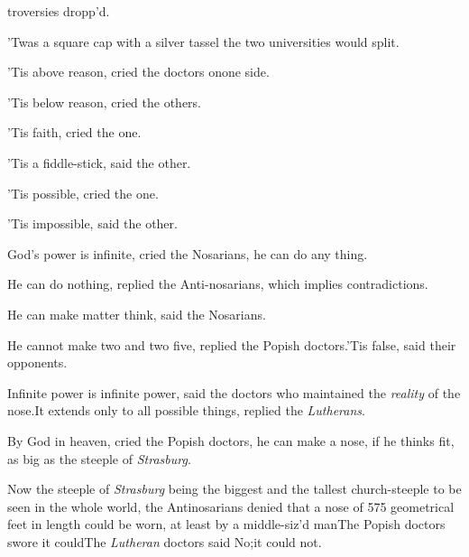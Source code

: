 \documentclass{article}
\begin{document}
\vskip -2pt

troversies dropp’d.

\vskip -2pt

’Twas a square cap with a silver tassel\break
{}
the two universities would split.

\vskip -2pt

’Tis above reason, cried the doctors on\break one side.

\vskip -2pt

’Tis below reason, cried the others.

\vskip -2pt

’Tis faith, cried the one.

’Tis a fiddle-stick, said the other.

’Tis possible, cried the one.

’Tis impossible, said the other.

God’s power is infinite, cried the No\-sarians, he can do
any thing.

He can do nothing, replied the Anti-nosarians, which implies
contradictions.

He can make matter think, said the Nosarians.


\break
{}

He cannot make two and two five, replied the Popish
doctors.\tsh ’Tis false, said their opponents.\tsk

Infinite power is infinite power, said the doctors who
maintained the \textit{reality}
of the nose.\tsh It extends only to
all possible things, replied the \textit{Lutherans}.

By God in heaven, cried the Popish doctors, he can make a nose,
if he thinks fit, as big as the steeple of \textit{Strasburg}.

Now the steeple of \textit{Strasburg} being the biggest and the
tallest church-steeple to be seen in the whole world, the
Antino\-sarians denied that a nose of 575 geome\-trical feet in length
could be worn, at least by a middle-siz’d
man\tsk The Popish doctors swore it could\tsk The
\textit{Lutheran} doctors said No;\tsk it could not.
\end{document}

